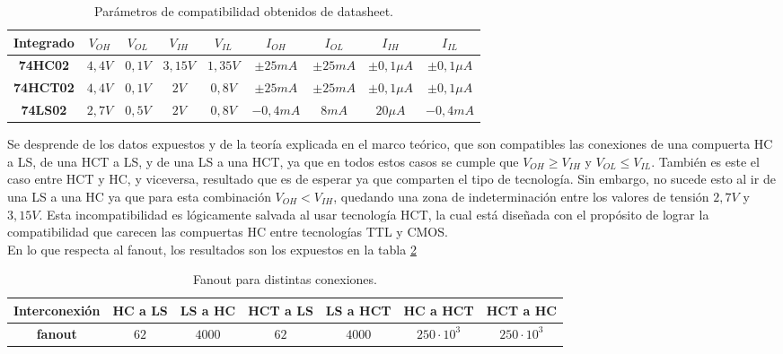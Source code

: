 \begin{table}[H]
    \begin{tabular}{ccccccccc}
    \textbf{Integrado} & \textbf{$V_{OH}$} & \textbf{$V_{OL}$} & \textbf{$V_{IH}$} & \textbf{$V_{IL}$} & \textbf{$I_{OH}$} & \textbf{$I_{OL}$} & \textbf{$I_{IH}$} & \textbf{$I_{IL}$} \\ \hline
    \textbf{74HC02}    & $4,4 V$           & $0,1 V$           & $3,15 V$          & $1,35 V$          & $\pm 25 mA$       & $\pm 25 mA$       & $\pm 0,1 \mu A$   & $\pm 0,1 \mu A$   \\
    \textbf{74HCT02}   & $4,4 V$           & $0,1 V$           & $2 V$             & $0,8 V$           & $\pm 25 mA$       & $\pm 25 mA$       & $\pm 0,1 \mu A$   & $\pm 0,1 \mu A$   \\
    \textbf{74LS02}    & $2,7 V$           & $0,5 V$           & $2 V$             & $0,8 V$           & $-0,4 mA$         & $8 mA$            & $20 \mu A$        & $-0,4 mA$        
    \end{tabular}
    \caption{Parámetros de compatibilidad obtenidos de datasheet.}
    \label{table:parameters_datasheet_ex5}
\end{table}

Se desprende de los datos expuestos y de la teoría explicada en el marco teórico, que son compatibles las conexiones de una compuerta HC a LS, de una HCT a LS, y de una 
LS a una HCT, ya que en todos estos casos se cumple que $V_{OH} \geq V_{IH}$ y $V_{OL} \leq V_{IL}$.
También es este el caso entre HCT y HC, y viceversa, resultado que es de esperar ya que comparten el tipo de tecnología.
Sin embargo, no sucede esto al ir de una LS a una HC ya que para esta combinación $V_{OH} < V_{IH}$, quedando una zona de indeterminación entre los valores de tensión 
$2,7 V$ y $3,15 V$.
Esta incompatibilidad es lógicamente salvada al usar tecnología HCT, la cual está diseñada con el propósito de lograr la compatibilidad que carecen las compuertas HC 
entre tecnologías TTL y CMOS.\\
En lo que respecta al fanout, los resultados son los expuestos en la tabla \ref{table:fanout_results_ex5}
\begin{table}[H]
    \begin{tabular}{ccccccc}
    \textbf{Interconexión} & \textbf{HC a LS} & \textbf{LS a HC} & \textbf{HCT a LS} & \textbf{LS a HCT} & \textbf{HC a HCT} & \textbf{HCT a HC} \\ \hline
    \textbf{fanout}        & $62$             & $4000$           & $62$              & $4000$            & $250 \cdot 10^3$  & $250 \cdot 10^3$ 
    \end{tabular}
    \caption{Fanout para distintas conexiones.}
    \label{table:fanout_results_ex5}
\end{table}



